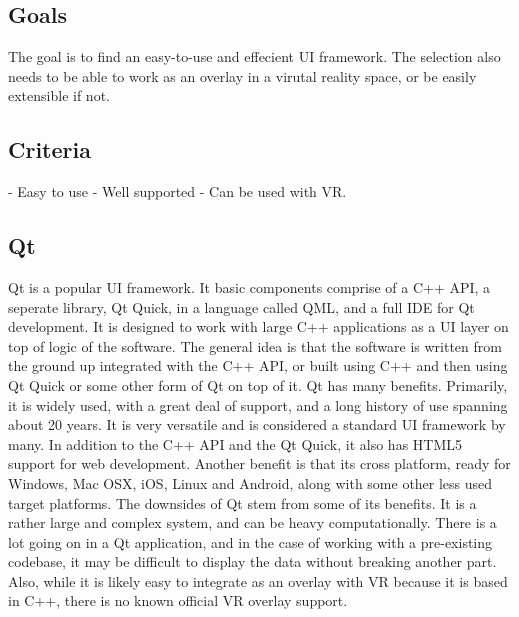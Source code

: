 \documentclass{article}
\begin{document}
\subsection{Goals}
The goal is to find an easy-to-use and effecient UI framework. The selection
also needs to be able to work as an overlay in a virutal reality space, or be
easily extensible if not. 

\subsection{Criteria}
- Easy to use
- Well supported
- Can be used with VR.

\subsection{Qt}
Qt is a popular UI framework. It basic components comprise of a C++ API, a seperate library, Qt Quick,
in a language called QML, and a full IDE for Qt development. It is designed to work with large C++ applications
as a UI layer on top of logic of the software. The general idea is that the software is written from the ground
up integrated with the C++ API, or built using C++ and then using Qt Quick or some other form of Qt on top of 
it. Qt has many benefits. Primarily, it is widely used, with a great deal of support, and a long history of
use spanning about 20 years. It is very versatile and is considered a standard UI framework by many. In
addition to the C++ API and the Qt Quick, it also has HTML5 support for web development. Another benefit
is that its cross platform, ready for Windows, Mac OSX, iOS, Linux and Android, along with some other 
less used target platforms. The downsides of Qt stem from some of its benefits. It is a rather large
and complex system, and can be heavy computationally. There is a lot going on in a Qt application,
and in the case of working with a pre-existing codebase, it may be difficult to display the data
without breaking another part. Also, while it is likely easy to integrate as an overlay with VR
because it is based in C++, there is no known official VR overlay support. 
\end{document}
